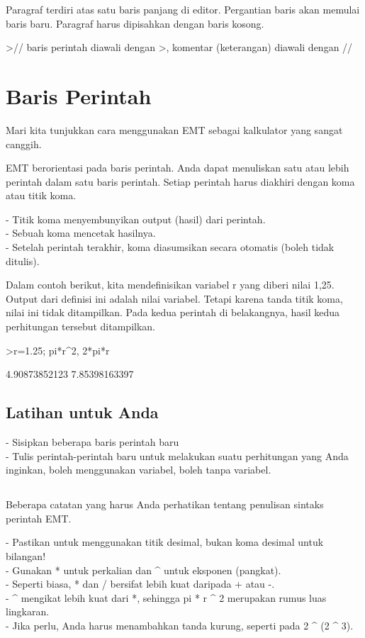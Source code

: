\documentclass{article}
\newenvironment{eulernotebook}{\par}{\par}
\newcommand{\eulerheading}[1]{\section{#1}}
\newcommand{\eulersubheading}[1]{\subsection{#1}}
\newenvironment{eulercomment}{\par\medskip}{\par\medskip}
\begin{document}
\begin{eulernotebook}
\begin{eulercomment}
Paragraf terdiri atas satu baris panjang di editor. Pergantian baris
akan memulai baris baru. Paragraf harus dipisahkan dengan baris
kosong.
\end{eulercomment}
\begin{eulerprompt}
>// baris perintah diawali dengan >, komentar (keterangan) diawali dengan //
\end{eulerprompt}
\eulerheading{Baris Perintah}
\begin{eulercomment}
Mari kita tunjukkan cara menggunakan EMT sebagai kalkulator yang sangat
canggih.

EMT berorientasi pada baris perintah. Anda dapat menuliskan satu atau lebih
perintah dalam satu baris perintah. Setiap perintah harus diakhiri dengan koma
atau titik koma.

- Titik koma menyembunyikan output (hasil) dari perintah.\\
- Sebuah koma mencetak hasilnya.\\
- Setelah perintah terakhir, koma diasumsikan secara otomatis (boleh tidak
ditulis).

Dalam contoh berikut, kita mendefinisikan variabel r yang diberi nilai 1,25.
Output dari definisi ini adalah nilai variabel. Tetapi karena tanda titik koma,
nilai ini tidak ditampilkan. Pada kedua perintah di belakangnya, hasil kedua
perhitungan tersebut ditampilkan.
\end{eulercomment}
\begin{eulerprompt}
>r=1.25; pi*r^2, 2*pi*r
\end{eulerprompt}
\begin{euleroutput}
  4.90873852123
  7.85398163397
\end{euleroutput}
\eulersubheading{Latihan untuk Anda}
\begin{eulercomment}
- Sisipkan beberapa baris perintah baru\\
- Tulis perintah-perintah baru untuk melakukan suatu perhitungan yang
Anda inginkan, boleh menggunakan variabel, boleh tanpa variabel.\\
\end{eulercomment}
\eulersubheading{}
\begin{eulercomment}
Beberapa catatan yang harus Anda perhatikan tentang penulisan sintaks
perintah EMT.

- Pastikan untuk menggunakan titik desimal, bukan koma desimal untuk
bilangan!\\
- Gunakan * untuk perkalian dan \textasciicircum{} untuk eksponen (pangkat).\\
- Seperti biasa, * dan / bersifat lebih kuat daripada + atau -.\\
- \textasciicircum{} mengikat lebih kuat dari *, sehingga pi * r \textasciicircum{} 2 merupakan rumus
luas lingkaran.\\
- Jika perlu, Anda harus menambahkan tanda kurung, seperti pada 2 \textasciicircum{} (2
\textasciicircum{} 3).


\end{eulercomment}
\end{eulernotebook}
\end{document}
